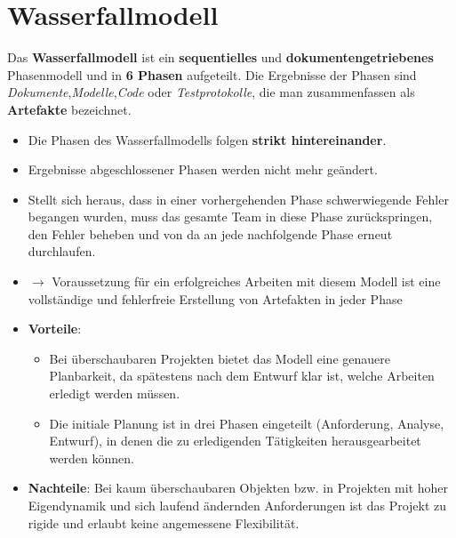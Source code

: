 \section{Wasserfallmodell}

\begin{tcolorbox}[title=Wasserfallmodell]
    Das \textbf{Wasserfallmodell} ist ein \textbf{sequentielles} und \textbf{dokumentengetriebenes} Phasenmodell und in \textbf{6 Phasen} aufgeteilt. Die Ergebnisse der Phasen sind \textit{Dokumente},\textit{Modelle},\textit{Code} oder \textit{Testprotokolle}, die man zusammenfassen als \textbf{Artefakte} bezeichnet.
    \begin{itemize}
        \item Die Phasen des Wasserfallmodells folgen \textbf{strikt hintereinander}.
        \item Ergebnisse abgeschlossener Phasen werden nicht mehr geändert.
        \item Stellt sich heraus, dass in einer vorhergehenden Phase schwerwiegende Fehler begangen wurden, muss das gesamte Team in diese Phase zurückspringen, den Fehler beheben und von da an jede nachfolgende Phase erneut durchlaufen.
        \item[] $\rightarrow$ Voraussetzung für ein erfolgreiches Arbeiten mit diesem Modell ist eine vollständige und fehlerfreie Erstellung von Artefakten in jeder Phase
        \item \textbf{Vorteile}:
        \begin{itemize}
            \item Bei überschaubaren Projekten bietet das Modell eine genauere Planbarkeit, da spätestens nach dem Entwurf klar ist, welche Arbeiten erledigt werden müssen.
            \item Die initiale Planung ist in drei Phasen eingeteilt (Anforderung, Analyse, Entwurf), in denen die zu erledigenden Tätigkeiten herausgearbeitet werden können.
        \end{itemize}
        \item \textbf{Nachteile}: Bei kaum überschaubaren Objekten bzw. in Projekten mit hoher Eigendynamik und sich laufend ändernden Anforderungen ist das Projekt zu rigide und erlaubt keine angemessene Flexibilität.
    \end{itemize}
\end{tcolorbox}

